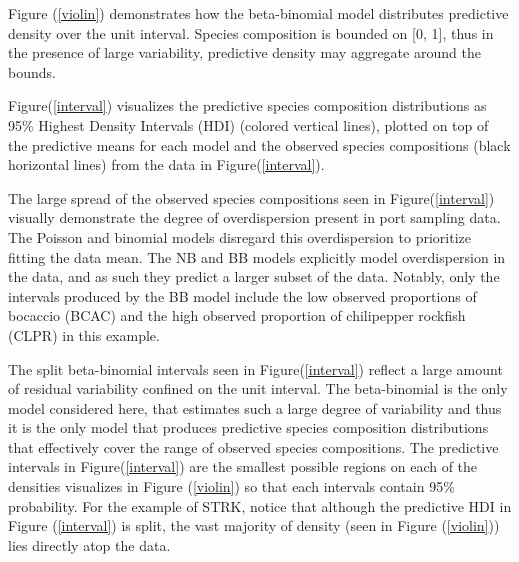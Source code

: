 \documentclass[12pt]{article}
\begin{document}
Figure (\ref{violin}) demonstrates how the beta-binomial model distributes 
predictive density over the unit interval. Species composition is bounded on 
{[}0, 1{]}, thus in the presence of large variability, predictive density may 
aggregate around the bounds.

Figure(\ref{interval}) visualizes the predictive species composition
distributions as 95\% Highest Density Intervals (HDI) (colored vertical
lines), plotted on top of the predictive means for each model and the
observed species compositions (black horizontal lines) from the data in
Figure(\ref{interval}).

The large spread of the observed species compositions seen in
Figure(\ref{interval}) visually demonstrate the degree of overdispersion
present in port sampling data. The Poisson and binomial models disregard
this overdispersion to prioritize fitting the data mean. The NB and BB
models explicitly model overdispersion in the data, and as such they
predict a larger subset of the data. Notably, only the intervals
produced by the BB model include the low observed proportions of
bocaccio (BCAC) and the high observed proportion of chilipepper rockfish
(CLPR) in this example.

The split beta-binomial intervals seen in Figure(\ref{interval}) reflect
a large amount of residual variability confined on the unit interval.
The beta-binomial is the only model considered here, that estimates such
a large degree of variability and thus it is the only model that
produces predictive species composition distributions that effectively
cover the range of observed species compositions. The predictive
intervals in Figure(\ref{interval}) are the smallest possible regions on
each of the densities visualizes in Figure (\ref{violin}) so that each
intervals contain 95\% probability. For the example of STRK, notice that
although the predictive HDI in Figure (\ref{interval}) is split, the vast
majority of density (seen in Figure (\ref{violin})) lies directly atop the
data.
\end{document}
